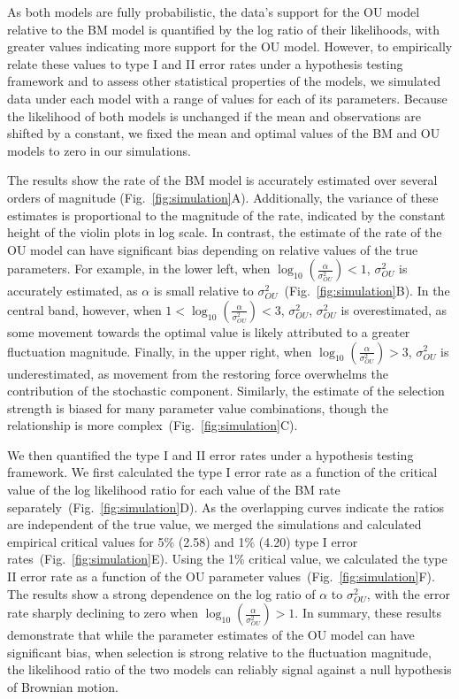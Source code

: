 As both models are fully probabilistic, the data's support for the OU model relative to the BM model is quantified by the log ratio of their likelihoods, with greater values indicating more support for the OU model. However, to empirically relate these values to type I and II error rates under a hypothesis testing framework and to assess other statistical properties of the models, we simulated data under each model with a range of values for each of its parameters. Because the likelihood of both models is unchanged if the mean and observations are shifted by a constant, we fixed the mean and optimal values of the BM and OU models to zero in our simulations.

The results show the rate of the BM model is accurately estimated over several orders of magnitude (Fig.~\ref{fig:simulation}A). Additionally, the variance of these estimates is proportional to the magnitude of the rate, indicated by the constant height of the violin plots in log scale. In contrast, the estimate of the rate of the OU model can have significant bias depending on relative values of the true parameters. For example, in the lower left, when $\log_{10}(\frac{\alpha}{\sigma^2_{OU}}) < 1$, $\sigma^2_{OU}$ is accurately estimated, as $\alpha$ is small relative to $\sigma^2_{OU}$~(Fig.~\ref{fig:simulation}B). In the central band, however, when $1 < \log_{10}(\frac{\alpha}{\sigma^2_{OU}}) < 3$, $\sigma^2_{OU}$, $\sigma^2_{OU}$ is overestimated, as some movement towards the optimal value is likely attributed to a greater fluctuation magnitude. Finally, in the upper right, when $\log_{10}(\frac{\alpha}{\sigma^2_{OU}}) > 3$, $\sigma^2_{OU}$ is underestimated, as movement from the restoring force overwhelms the contribution of the stochastic component. Similarly, the estimate of the selection strength is biased for many parameter value combinations, though the relationship is more complex~(Fig.~\ref{fig:simulation}C).

We then quantified the type I and II error rates under a hypothesis testing framework. We first calculated the type I error rate as a function of the critical value of the log likelihood ratio for each value of the BM rate separately~(Fig.~\ref{fig:simulation}D). As the overlapping curves indicate the ratios are independent of the true value, we merged the simulations and calculated empirical critical values for 5\% (2.58) and 1\% (4.20) type I error rates~(Fig.~\ref{fig:simulation}E). Using the 1\% critical value, we calculated the type II error rate as a function of the OU parameter values~(Fig.~\ref{fig:simulation}F). The results show a strong dependence on the log ratio of $\alpha$ to $\sigma^2_{OU}$, with the error rate sharply declining to zero when $\log_{10}(\frac{\alpha}{\sigma^2_{OU}}) > 1$. In summary, these results demonstrate that while the parameter estimates of the OU model can have significant bias, when selection is strong relative to the fluctuation magnitude, the likelihood ratio of the two models can reliably signal against a null hypothesis of Brownian motion.

